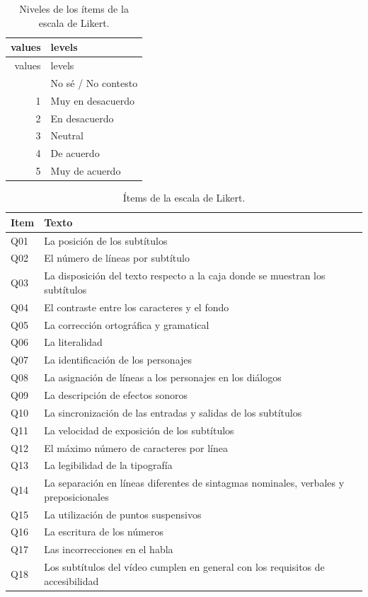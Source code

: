 \documentclass[
  12pt,
  a4paper,
  extrafontsizes,
  onecolumn,
  openright,
  table]{memoir}
\begin{document}
\hypertarget{tbl-likert-levels}{}
\begin{longtable}[]{@{}rl@{}}
\caption{\label{tbl-likert-levels}Niveles de los ítems de la escala de
Likert.}\tabularnewline
\toprule\noalign{}
values & levels \\
\midrule\noalign{}
\endfirsthead
\toprule\noalign{}
values & levels \\
\midrule\noalign{}
\endhead
\bottomrule\noalign{}
\endlastfoot
0 & No sé / No contesto \\
1 & Muy en desacuerdo \\
2 & En desacuerdo \\
3 & Neutral \\
4 & De acuerdo \\
5 & Muy de acuerdo \\
\end{longtable}

\hypertarget{tbl-likert-scale}{}
\begin{longtable}{ll}
\caption{\label{tbl-likert-scale}Ítems de la escala de Likert. }\tabularnewline

\toprule
Item & Texto \\ 
\midrule
Q01 & La posición de los subtítulos \\ 
Q02 & El número de líneas por subtítulo \\ 
Q03 & La disposición del texto respecto a la caja donde se muestran los subtítulos \\ 
Q04 & El contraste entre los caracteres y el fondo \\ 
Q05 & La corrección ortográfica y gramatical \\ 
Q06 & La literalidad \\ 
Q07 & La identificación de los personajes \\ 
Q08 & La asignación de líneas a los personajes en los diálogos \\ 
Q09 & La descripción de efectos sonoros \\ 
Q10 & La sincronización de las entradas y salidas de los subtítulos \\ 
Q11 & La velocidad de exposición de los subtítulos \\ 
Q12 & El máximo número de caracteres por línea \\ 
Q13 & La legibilidad de la tipografía \\ 
Q14 & La separación en líneas diferentes de sintagmas nominales, verbales y preposicionales \\ 
Q15 & La utilización de puntos suspensivos \\ 
Q16 & La escritura de los números \\ 
Q17 & Las incorrecciones en el habla \\ 
Q18 & Los subtítulos del vídeo cumplen en general con los requisitos de accesibilidad \\ 
\bottomrule
\end{longtable}
\end{document}
